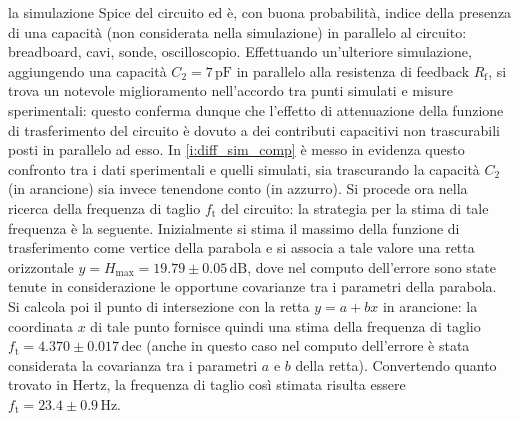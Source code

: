 \documentclass[a4paper,11pt]{article} %
\begin{document}
	\noindent la simulazione Spice del circuito ed è, con buona probabilità, indice della presenza di una capacità (non
	considerata nella simulazione) in parallelo al circuito: breadboard, cavi, sonde, oscilloscopio. Effettuando
	un'ulteriore simulazione, aggiungendo una capacità $C_{2}=7\,\si{\pF}$ in parallelo alla resistenza di feedback
	$R_{\text{f}}$, si trova un notevole miglioramento nell'accordo tra punti simulati e misure sperimentali: questo
	conferma dunque che l'effetto di attenuazione della funzione di trasferimento del circuito è dovuto a dei contributi
	capacitivi non trascurabili posti in parallelo ad esso. In \autoref{i:diff_sim_comp} è messo in evidenza questo
	confronto tra i dati sperimentali e quelli simulati, sia trascurando la capacità $C_{2}$ (in arancione) sia invece
	tenendone conto (in azzurro). Si procede ora nella ricerca della frequenza di taglio $f_{\text{t}}$ del circuito: la
	strategia per la stima di tale frequenza è la seguente. Inizialmente si stima il massimo della funzione di
	trasferimento come vertice della parabola e si associa a tale valore una retta orizzontale
	$y=H_{\text{max}}=19.79\pm 0.05\,\text{dB}$, dove nel computo dell'errore sono state tenute in considerazione le
	opportune covarianze tra i parametri della parabola. Si calcola poi il punto di intersezione con la retta  $y=a+bx$
	in arancione: la coordinata $x$ di tale punto fornisce quindi una stima della frequenza di taglio
	$f_{\text{t}}=4.370 \pm 0.017\,\text{dec}$ (anche in questo caso nel computo dell'errore è stata considerata la
	covarianza tra i parametri $a$ e $b$ della retta). Convertendo quanto trovato in Hertz, la frequenza di taglio così
	stimata risulta essere $f_{\text{t}}=23.4 \pm 0.9\,\si{\Hz}$.
\end{document}
